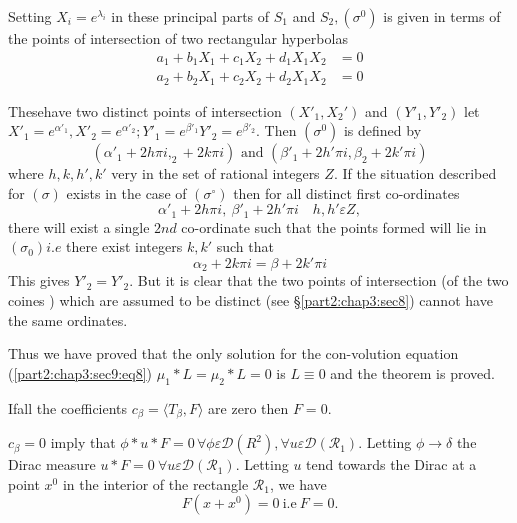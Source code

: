Setting $X_i = e^{\lambda_i}$ in these principal parts of $S_1$ and
$S_2, (\sigma^0)$ is given in terms of the points of intersection of
two rectangular hyperbolas  
\begin{align*}
  a_1 + b_1 X_1 + c_1 X_2 + d_1 X_1 X_2 & = 0\\
  a_2+ b_2 X_1 + c_2 X_2 + d_2 X_1 X_2 & = 0
\end{align*}

These\pageoriginale have two distinct points of intersection $(X'_1,X_2')$ and
$(Y'_1,Y'_2)$ let $X'_1 = e^{\alpha'_1},  X'_2 = e^{\alpha'_2} ;
Y'_1 = e^{\beta'_1} Y'_2 = e^{\beta'_2}$. Then $(\sigma^0)$ is defined
by 
$$
(\alpha'_1 +2h \pi i,_2 +2k \pi i) \text { and } (\beta'_1 + 2h' \pi
i, \beta_2 +2k' \pi i)  
$$
where $h,k,h',k'$ very in the set of rational integers $Z$. If the
situation described for $(\sigma)$ exists in the case of $(\sigma^\circ)$
then for all distinct first co-ordinates  
$$
\alpha'_1 + 2h \pi i, ~\beta'_1 + 2h' \pi i \quad h, h' \varepsilon Z,
$$
there will exist a single $2nd$ co-ordinate such that the points
formed will lie in $(\sigma_0)i.e$ there exist integers $k, k'$ such
that 
$$
\alpha_2 + 2k \pi i = \beta + 2 k' \pi i
$$
This gives $Y'_2 = Y'_2$. But it is clear that the two points of
intersection (of the two coines ) which are assumed to be distinct
(see \S \ref{part2:chap3:sec8}) cannot have the same ordinates. 

Thus we have proved that the only solution for the con-volution
equation (\ref{part2:chap3:sec9:eq8}) $\mu_1 * L = \mu_2 * L = 0$ is
$L \equiv 0$ and the theorem is proved. 



If\pageoriginale all the coefficients $c_\beta = \langle T_\beta, F \rangle$ are
zero then $F=0$.   

$c_\beta =0$ imply that $\phi * u * F = 0\, \forall \phi \varepsilon
\mathscr{D} (R^2), \forall u \varepsilon \mathscr{D}
(\mathcal{R_1})$. Letting $\phi \to \delta$ the Dirac measure $u*F = 0~
\forall u \varepsilon \mathscr{D} (\mathscr{R}_1)$. Letting $u$ tend
towards the Dirac at a point $x^0$  in the interior of the rectangle
$\mathscr{R}_1$, we have  
$$
F (x + x^0) = 0 ~\text{i.e}~ F=0.
$$
